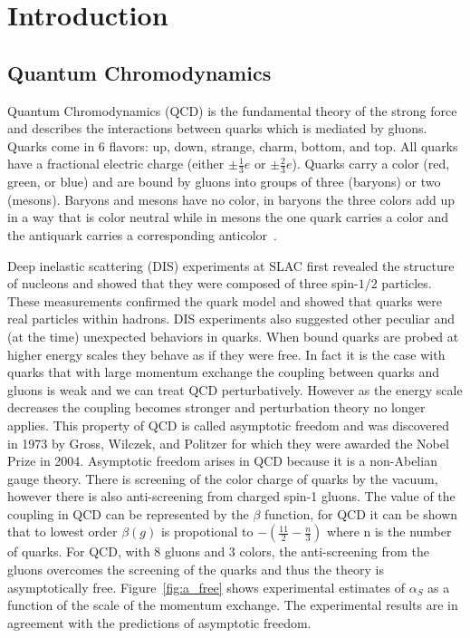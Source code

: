\chapter{Introduction}

\section{Quantum Chromodynamics}

Quantum Chromodynamics (QCD) is the fundamental theory of the strong force and describes the interactions between quarks which is mediated by gluons. Quarks come in 6 flavors: up, down, strange, charm, bottom, and top. All quarks have a fractional electric charge (either $\pm \frac{1}{3}e$ or $\pm \frac{2}{3}e$). Quarks carry a color (red, green, or blue) and are bound by gluons into groups of three (baryons) or two (mesons). Baryons and mesons have no color, in baryons the three colors add up in a way that is color neutral while in mesons the one quark carries a color and the antiquark carries a corresponding anticolor~\cite{quarkmod}. 

Deep inelastic scattering (DIS) experiments at SLAC first revealed the structure of nucleons and showed that they were composed of three spin-$1/2$ particles. These measurements confirmed the quark model and showed that quarks were real particles within hadrons. DIS experiments also suggested other peculiar and (at the time) unexpected behaviors in quarks. When bound quarks are probed at higher energy scales they behave as if they were free. In fact it is the case with quarks that with large momentum exchange the coupling between quarks and gluons is weak and we can treat QCD perturbatively. However as the energy scale decreases the coupling becomes stronger and perturbation theory no longer applies. This property of QCD is called asymptotic freedom and was discovered in 1973 by Gross, Wilczek, and Politzer for which they were awarded the Nobel Prize in 2004. Asymptotic freedom arises in QCD because it is a non-Abelian gauge theory. There is screening of the color charge of quarks by the vacuum, however there is also anti-screening from charged spin-1 gluons. The value of the coupling in QCD can be represented by the $\beta$ function, for QCD it can be shown that to lowest order $\beta(g)$ is propotional to $-(\frac{11}{2} - \frac{n}{3})$ where n is the number of quarks. For QCD, with 8 gluons and 3 colors, the anti-screening from the gluons overcomes the screening of the quarks and thus the theory is asymptotically free. Figure~\ref{fig:a_free} shows experimental estimates of $\alpha_S$ as a function of the scale of the momentum exchange. The experimental results are in agreement with the predictions of asymptotic freedom. 

